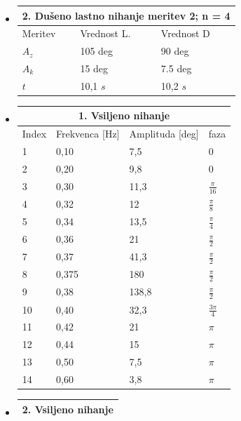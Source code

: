 \begin{itemize}
\begin{tabular}{|p{1.5cm}|p{1.5cm}|p{1.5cm}|}
        \hline
    \end{tabular}
\item[]
    \begin{tabular}{|p{1.5cm}|p{1.5cm}|p{1.5cm}|}
        \hline
        \multicolumn{3}{|c|}{2. Dušeno lastno nihanje meritev 2; n = 4}\\
        \hline
        Meritev & Vrednost L. & Vrednost D\\
        \hline
        $A_z$ & 105 deg & 90 deg\\
        $A_k$ & 15 deg & 7.5 deg\\
        $t$ & 10,1 $s$ & 10,2 $s$\\
        \hline
    \end{tabular}
\item[]
    \begin{tabular}{|p{1.5cm}|p{1.5cm}|p{1.5cm}|p{1.5cm}|}
        \hline
        \multicolumn{4}{|c|}{1. Vsiljeno nihanje}\\
        \hline
        Index & Frekvenca [Hz] & Amplituda [deg] & faza\\
        \hline
        1 & 0,10 & 7,5 & 0\\
        2 & 0,20 & 9,8 & 0\\
        3 & 0,30 & 11,3 & $\frac{\pi}{16}$\\
        4 & 0,32 & 12 & $\frac{\pi}{8}$\\
        5 & 0,34 & 13,5 & $\frac{\pi}{4}$\\
        6 & 0,36 & 21 & $\frac{\pi}{2}$\\
        7 & 0,37 & 41,3 & $\frac{\pi}{2}$\\
        \hline
        8 & 0,375 & 180 & $\frac{\pi}{2}$\\
        \hline
        9 & 0,38 & 138,8 & $\frac{\pi}{2}$\\
        10 & 0,40 & 32,3 & $\frac{3\pi}{4}$\\
        11 & 0,42 & 21 & $\pi$\\
        12 & 0,44 & 15 & $\pi$\\
        13 & 0,50 & 7,5 & $\pi$\\
        14 & 0,60 & 3,8 & $\pi$\\
        \hline
    \end{tabular}
\item[]
    \begin{tabular}{|p{1.5cm}|p{1.5cm}|p{1.5cm}|p{1.5cm}|}
        \hline
        \multicolumn{4}{|c|}{2. Vsiljeno nihanje}\\
        \hline

\end{tabular}
\end{itemize}

